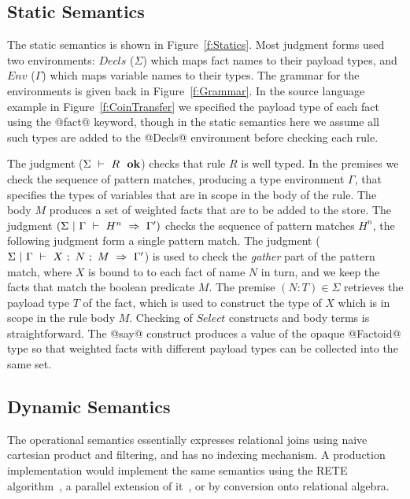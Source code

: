\clearpage{}


\subsection{Static Semantics}
The static semantics is shown in Figure~\ref{f:Statics}. Most judgment forms used two environments: $Decls$ ($\Sigma$) which maps fact names to their payload types, and $Env$ ($\Gamma$) which maps variable names to their types. The grammar for the environments is given back in Figure~\ref{f:Grammar}. In the source language example in Figure~\ref{f:CoinTransfer} we specified the payload type of each fact using the @fact@ keyword, though in the static semantics here we assume all such types are added to the @Decls@ environment before checking each rule.

The judgment ($\Sigma ~\vdash~ R~~ \textbf{ok}$) checks that rule $R$ is well typed. In the premises we check the sequence of pattern matches, producing a type environment $\Gamma$, that specifies the types of variables that are in scope in the body of the rule. The body $M$ produces a set of weighted facts that are to be added to the store. The judgment $(\Sigma~|~\Gamma~\vdash~H^n~\Rightarrow~\Gamma')$ checks the sequence of pattern matches $H^n$, the following judgment form a single pattern match. The judgment ($\Sigma~|~\Gamma~\vdash~X ~;~ N ~;~ M~\Rightarrow~\Gamma'$) is used to check the \emph{gather} part of the pattern match, where $X$ is bound to to each fact of name $N$ in turn, and we keep the facts that match the boolean predicate $M$. The premise $(N:T) \in \Sigma$ retrieves the payload type $T$ of the fact, which is used to construct the type of $X$ which is in scope in the rule body $M$. Checking of $Select$ constructs and body terms is straightforward. The @say@ construct produces a value of the opaque @Factoid@ type so that weighted facts with different payload types can be collected into the same set.


\subsection{Dynamic Semantics}
The operational semantics essentially expresses relational joins using naive cartesian product and filtering, and has no indexing mechanism. A production implementation would implement the same semantics using the RETE algorithm~\cite{Forgy1981:RETE, Doorenbos1995:ProductionMatching}, a parallel extension of it~\cite{Aref1998:LanaMatch}, or by conversion onto relational algebra.

